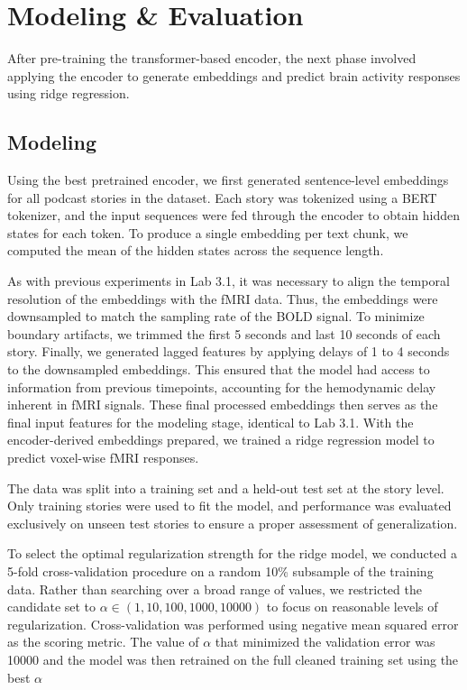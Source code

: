 \documentclass[11pt,letterpaper]{article}
\begin{document}
\newpage
\vspace{1em} %
\section{Modeling \& Evaluation}
\vspace{0.5em} %
After pre-training the transformer-based encoder, the next phase involved applying the encoder to generate embeddings and predict brain activity responses using ridge regression.

\vspace{1em} %
\subsection{Modeling}
\vspace{0.5em} %
Using the best pretrained encoder, we first generated sentence-level embeddings for all podcast stories in the dataset. Each story was tokenized using a BERT tokenizer, and the input sequences were fed through the encoder to obtain hidden states for each token. To produce a single embedding per text chunk, we computed the mean of the hidden states across the sequence length.

As with previous experiments in Lab 3.1, it was necessary to align the temporal resolution of the embeddings with the fMRI data. Thus, the embeddings were downsampled to match the sampling rate of the BOLD signal. To minimize boundary artifacts, we trimmed the first 5 seconds and last 10 seconds of each story. Finally, we generated lagged features by applying delays of 1 to 4 seconds to the downsampled embeddings. This ensured that the model had access to information from previous timepoints, accounting for the hemodynamic delay inherent in fMRI signals. These final processed embeddings then serves as the final input features for the modeling stage, identical to Lab 3.1. With the encoder-derived embeddings prepared, we trained a ridge regression model to predict voxel-wise fMRI responses.

The data was split into a training set and a held-out test set at the story level. Only training stories were used to fit the model, and performance was evaluated exclusively on unseen test stories to ensure a proper assessment of generalization.

To select the optimal regularization strength for the ridge model, we conducted a 5-fold cross-validation procedure on a random 10\% subsample of the training data. Rather than searching over a broad range of values, we restricted the candidate set to 
$\alpha \in (1, 10, 100, 1000, 10000)$
to focus on reasonable levels of regularization. Cross-validation was performed using negative mean squared error as the scoring metric. The value of $\alpha$ that minimized the validation error was 10000 and the model was then retrained on the full cleaned training set using the best $\alpha$
\end{document}
